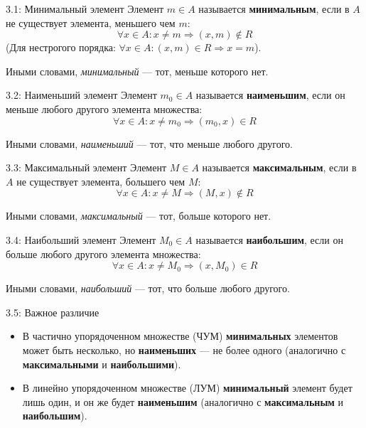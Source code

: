 \documentclass[a4paper,12pt]{article}
\begin{document}
	\begin{definitionbox}{3.1: Минимальный элемент}
		Элемент $m \in A$ называется \textbf{минимальным}, если в $A$ не существует элемента, меньшего чем $m$:
		\[ \forall x \in A: x \neq m \Rightarrow (x, m) \notin R \]
		(Для нестрогого порядка: $\forall x \in A: (x, m) \in R \Rightarrow x = m$).
		
		Иными словами, \textit{минимальный} — тот, меньше которого нет.
	\end{definitionbox}
	
	\begin{definitionbox}{3.2: Наименьший элемент}
		Элемент $m_0 \in A$ называется \textbf{наименьшим}, если он меньше любого другого элемента множества:
		\[ \forall x \in A: x \neq m_0 \Rightarrow (m_0, x) \in R \]
		
		Иными словами, \textit{наименьший} — тот, что меньше любого другого.
	\end{definitionbox}
	
	\begin{definitionbox}{3.3: Максимальный элемент}
		Элемент $M \in A$ называется \textbf{максимальным}, если в $A$ не существует элемента, большего чем $M$:
		\[ \forall x \in A: x \neq M \Rightarrow (M, x) \notin R \]
		
		Иными словами, \textit{максимальный} — тот, больше которого нет.
	\end{definitionbox}
	
	\begin{definitionbox}{3.4: Наибольший элемент}
		Элемент $M_0 \in A$ называется \textbf{наибольшим}, если он больше любого другого элемента множества:
		\[ \forall x \in A: x \neq M_0 \Rightarrow (x, M_0) \in R \]
		
		Иными словами, \textit{наибольший} — тот, что больше любого другого.
	\end{definitionbox}
	
	\begin{importantbox}{3.5: Важное различие}
		\begin{itemize}
			\item В частично упорядоченном множестве (ЧУМ) \textbf{минимальных} элементов может быть несколько, но \textbf{наименьших} — не более одного (аналогично с \textbf{максимальными} и \textbf{наибольшими}).
			\item В линейно упорядоченном множестве (ЛУМ) \textbf{минимальный} элемент будет лишь один, и он же будет \textbf{наименьшим} (аналогично с \textbf{максимальным} и \textbf{наибольшим}).
		\end{itemize}
	\end{importantbox}
	
\end{document}
